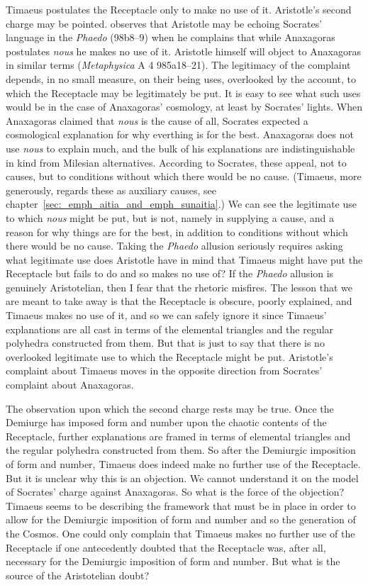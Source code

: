 Timaeus postulates the Receptacle only to make no use of it. Aristotle's second charge may be pointed. \citet[40]{Gregory:2003aa} observes that Aristotle may be echoing Socrates' language in the \emph{Phaedo} (98b8--9) when he complains that while Anaxagoras postulates \emph{nous} he makes no use of it. Aristotle himself will object to Anaxagoras in similar terms (\emph{Metaphysica} A 4 985a18--21). The legitimacy of the complaint depends, in no small measure, on their being uses, overlooked by the account, to which the Receptacle may be legitimately be put. It is easy to see what such uses would be in the case of Anaxagoras' cosmology, at least by Socrates' lights. When Anaxagoras claimed that \emph{nous} is the cause of all, Socrates expected a cosmological explanation for why everthing is for the best. Anaxagoras does not use \emph{nous} to explain much, and the bulk of his explanations are indistinguishable in kind from Milesian alternatives. According to Socrates, these appeal, not to causes, but to conditions without which there would be no cause. (Timaeus, more generously, regards these as auxiliary causes, see chapter~\ref{sec:_emph_aitia_and_emph_sunaitia}.) We can see the legitimate use to which \emph{nous} might be put, but is not, namely in supplying a cause, and a reason for why things are for the best, in addition to conditions without which there would be no cause. Taking the \emph{Phaedo} allusion seriously requires asking what legitimate use does Aristotle have in mind that Timaeus might have put the Receptacle but fails to do and so makes no use of? If the \emph{Phaedo} allusion is genuinely Aristotelian, then I fear that the rhetoric misfires. The lesson that we are meant to take away is that the Receptacle is obscure, poorly explained, and Timaeus makes no use of it, and so we can safely ignore it since Timaeus' explanations are all cast in terms of the elemental triangles and the regular polyhedra constructed from them. But that is just to say that there is no overlooked legitimate use to which the Receptacle might be put. Aristotle's complaint about Timaeus moves in the opposite direction from Socrates' complaint about Anaxagoras.

The observation upon which the second charge rests may be true. Once the Demiurge has imposed form and number upon the chaotic contents of the Receptacle, further explanations are framed in terms of elemental triangles and the regular polyhedra constructed from them. So after the Demiurgic imposition of form and number, Timaeus does indeed make no further use of the Receptacle. But it is unclear why this is an objection. We cannot understand it on the model of Socrates' charge against Anaxagoras. So what is the force of the objection? Timaeus seems to be describing the framework that must be in place in order to allow for the Demiurgic imposition of form and number and so the generation of the Cosmos. One could only complain that Timaeus makes no further use of the Receptacle if one antecedently doubted that the Receptacle was, after all, necessary for the Demiurgic imposition of form and number. But what is the source of the Aristotelian doubt?

